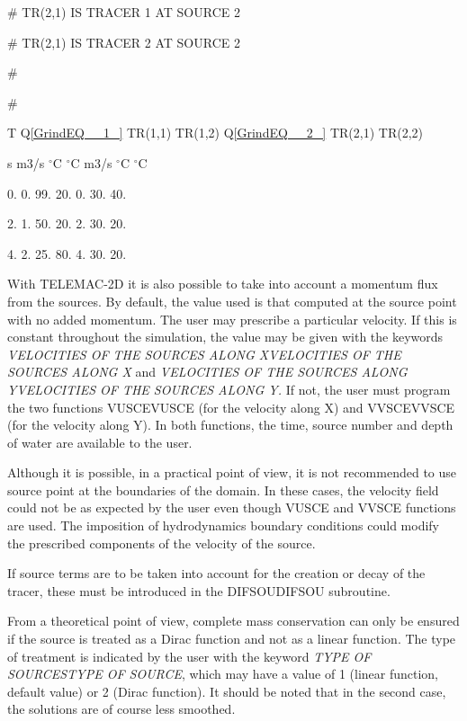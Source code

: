 \documentclass{article} %
\begin{document}
 \#  TR(2,1) IS TRACER 1 AT SOURCE 2

 \#  TR(2,1) IS TRACER 2 AT SOURCE 2

 \#

 \#

 T     Q\eqref{GrindEQ__1_}   TR(1,1)    TR(1,2)   Q\eqref{GrindEQ__2_}   TR(2,1)   TR(2,2)

 s     m3/s    ${}^\circ$C        ${}^\circ$C        m3/s     ${}^\circ$C        ${}^\circ$C

 0.     0.     99.        20.        0.      30.      40.

 2.     1.     50.        20.        2.      30.      20.

 4.     2.     25.        80.        4.      30.      20.

 With TELEMAC-2D it is also possible to take into account a momentum flux from the sources. By default, the value used is that computed at the source point with no added momentum. The user may prescribe a particular velocity. If this is constant throughout the simulation, the value may be given with the keywords \textit{VELOCITIES OF THE SOURCES ALONG XVELOCITIES OF THE SOURCES ALONG X} and \textit{VELOCITIES OF THE SOURCES ALONG YVELOCITIES OF THE SOURCES ALONG Y.} If not, the user must program the two functions VUSCEVUSCE (for the velocity along X) and VVSCEVVSCE (for the velocity along Y). In both functions, the time, source number and depth of water are available to the user.

 Although it is possible, in a practical point of view, it is not recommended to use source point at the boundaries of the domain. In these cases, the velocity field could not be as expected by the user even though VUSCE and VVSCE functions are used. The imposition of hydrodynamics boundary conditions could modify the prescribed components of the velocity of the source.

 If source terms are to be taken into account for the creation or decay of the tracer, these must be introduced in the DIFSOUDIFSOU subroutine.

 From a theoretical point of view, complete mass conservation can only be ensured if the source is treated as a Dirac function and not as a linear function. The type of treatment is indicated by the user with the keyword \textit{TYPE OF SOURCESTYPE OF SOURCE}, which may have a value of 1 (linear function, default value) or 2 (Dirac function). It should be noted that in the second case, the solutions are of course less smoothed.
\end{document}
